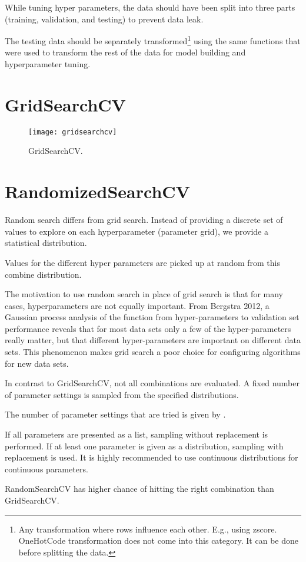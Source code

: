 \begin{numberedlist}
\begin{numberedlist}
		\end{numberedlist}
		\item While tuning hyper parameters, the data should have been split into three parts (training, validation, and testing) to prevent data leak.
		\item The testing data should be separately transformed\footnote{ Any transformation where rows influence each other. E.g., using zscore. OneHotCode
transformation does not come into this category. It can be done before splitting the data.} using the same functions that were used to transform the rest of the data for model building and hyperparameter tuning.
	\end{numberedlist}

	\section{GridSearchCV}

	\begin{figure}[tbh]
		\centering
		\texttt{[image: gridsearchcv]}
		\caption[GridSearchCV]{GridSearchCV.}
		\label{fig:gridsearchcv}
	\end{figure}


	\section{\codefont RandomizedSearchCV}

	\begin{bulletedlist}
	\item Random search differs from grid search. Instead of providing a discrete set of values to explore on each hyperparameter (parameter grid), we provide a statistical distribution.
	\item Values for the different hyper parameters are picked up at random from this combine distribution.
	\item The motivation to use random search in place of grid search is that for many cases, hyperparameters are not equally important.  From Bergstra 2012, a Gaussian process analysis of the function from hyper-parameters to validation set performance reveals that for most data sets only a few of the hyper-parameters really matter, but that different hyper-parameters
are important on different data sets. This phenomenon makes grid search a poor choice for configuring algorithms for new data sets.
	\item In contrast to GridSearchCV, not all combinations are evaluated.  A fixed number of parameter settings is sampled from the specified distributions.
	\item The number of parameter settings that are tried is given by .
	\item If all parameters are presented as a list, sampling without replacement is performed. If at least one parameter is given as a distribution, sampling with replacement is used. It is highly recommended to use continuous distributions for continuous parameters.
	\item RandomSearchCV has higher chance of hitting the right combination than GridSearchCV.
	\end{bulletedlist}

